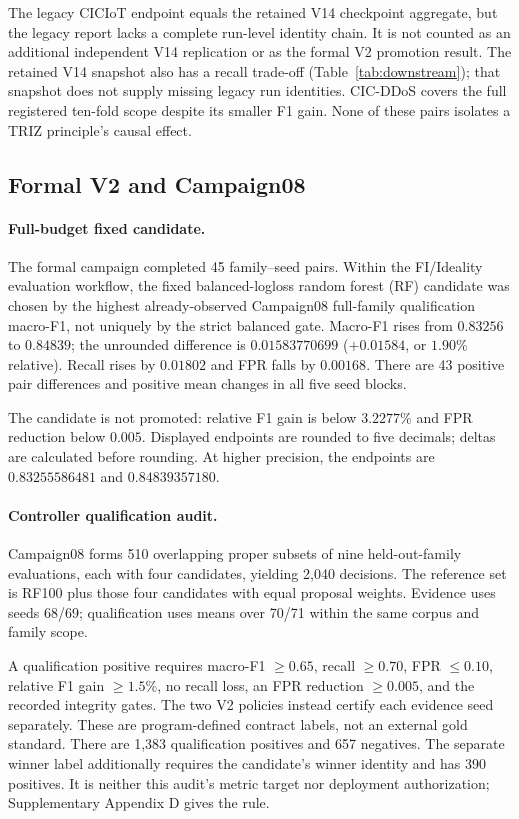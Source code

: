 \documentclass[sigconf]{acmart}
\begin{document}
The legacy CICIoT endpoint equals the retained V14 checkpoint aggregate,
but the legacy report lacks a complete run-level identity chain.
It is not counted as an additional independent V14 replication or as the
formal V2 promotion result. The retained V14 snapshot also has a recall
trade-off (Table~\ref{tab:downstream}); that snapshot does not supply
missing legacy run identities. CIC-DDoS covers the full registered
ten-fold scope despite its smaller F1 gain. None of these pairs isolates
a TRIZ principle's causal effect.

\subsection{Formal V2 and Campaign08}
\label{sec:controller-audit}

\paragraph{Full-budget fixed candidate.}
The formal campaign completed 45 family--seed pairs. Within the FI/Ideality
evaluation workflow, the fixed balanced-logloss random forest (RF) candidate was chosen
by the highest already-observed Campaign08 full-family qualification
macro-F1, not uniquely by the strict balanced gate. Macro-F1 rises from
$0.83256$ to $0.84839$; the unrounded difference is $0.01583770699$
($+0.01584$, or $1.90\%$ relative). Recall rises by $0.01802$ and FPR
falls by $0.00168$. There are 43 positive pair differences and positive
mean changes in all five seed blocks.

The candidate is not promoted: relative F1 gain is below $3.2277\%$ and
FPR reduction below $0.005$. Displayed endpoints are rounded to five
decimals; deltas are calculated before rounding. At higher precision,
the endpoints are $0.83255586481$ and $0.84839357180$.

\paragraph{Controller qualification audit.}
Campaign08 forms 510 overlapping proper subsets of nine held-out-family
evaluations, each with four candidates, yielding 2,040 decisions. The
reference set is RF100 plus those four candidates with equal proposal
weights. Evidence uses seeds 68/69; qualification uses means over
70/71 within the same corpus and family scope.

A qualification positive requires macro-F1 $\geq0.65$, recall $\geq0.70$,
FPR $\leq0.10$, relative F1 gain $\geq1.5\%$, no recall loss, an FPR
reduction $\geq0.005$, and the recorded integrity gates. The two V2
policies instead certify each evidence seed separately.
These are program-defined contract labels, not an external gold standard.
There are 1,383 qualification positives and 657 negatives.
The separate winner label additionally requires the candidate's winner
identity and has 390 positives. It is neither this audit's metric target
nor deployment authorization; Supplementary Appendix D gives the rule.
\end{document}
